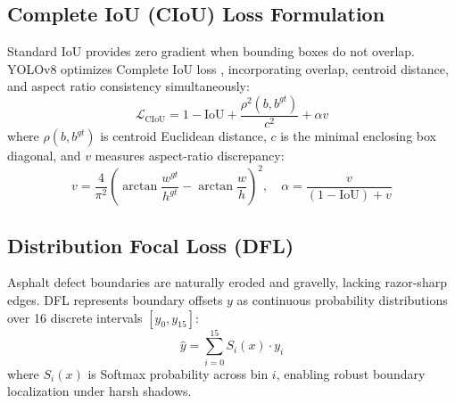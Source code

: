 \documentclass[conference]{IEEEtran}
\begin{document}
\subsection{Complete IoU (CIoU) Loss Formulation}
Standard IoU provides zero gradient when bounding boxes do not overlap. YOLOv8 optimizes Complete IoU loss \cite{diou}, incorporating overlap, centroid distance, and aspect ratio consistency simultaneously:
\begin{equation}
\mathcal{L}_{\text{CIoU}} = 1 - \text{IoU} + \frac{\rho^2(b, b^{gt})}{c^2} + \alpha v
\end{equation}
where $\rho(b, b^{gt})$ is centroid Euclidean distance, $c$ is the minimal enclosing box diagonal, and $v$ measures aspect-ratio discrepancy:
\begin{equation}
v = \frac{4}{\pi^2}\left(\arctan\frac{w^{gt}}{h^{gt}} - \arctan\frac{w}{h}\right)^2, \quad \alpha = \frac{v}{(1 - \text{IoU}) + v}
\end{equation}

\subsection{Distribution Focal Loss (DFL)}
Asphalt defect boundaries are naturally eroded and gravelly, lacking razor-sharp edges. DFL \cite{gfl} represents boundary offsets $y$ as continuous probability distributions over 16 discrete intervals $[y_0, y_{15}]$:
\begin{equation}
\hat{y} = \sum_{i=0}^{15} S_i(x) \cdot y_i
\end{equation}
where $S_i(x)$ is Softmax probability across bin $i$, enabling robust boundary localization under harsh shadows.
\end{document}
